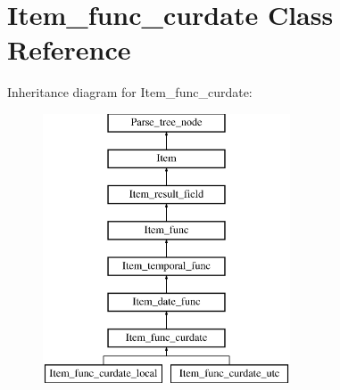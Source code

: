 \hypertarget{classItem__func__curdate}{}\section{Item\+\_\+func\+\_\+curdate Class Reference}
\label{classItem__func__curdate}
Inheritance diagram for Item\+\_\+func\+\_\+curdate\+:\begin{figure}[H]
\begin{center}
\leavevmode
\includegraphics[height=8.000000cm]{classItem__func__curdate}
\end{center}
\end{figure}
